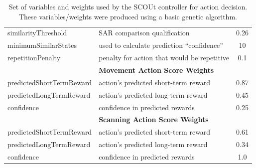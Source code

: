 \begin{table}
{\begin{tabular}{ l l c }
    similarityThreshold               & SAR comparison qualification  & 0.26  \\
    minimumSimilarStates              & used to calculate prediction ``confidence''    & 10    \\
    repetitionPenalty                 & penalty for action that would be repetitive                & 0.1   \\
    \hline
                                      & \textbf{Movement Action Score Weights}& \\
    predictedShortTermReward          & action's predicted short-term reward       & 0.87  \\
    predictedLongTermReward           & action's predicted long-term reward      & 0.45  \\
    confidence                        & confidence in predicted rewards       & 0.25  \\
    \hline
                                      & \textbf{Scanning Action Score Weights}& \\
    predictedShortTermReward          & action's predicted short-term reward       & 0.61  \\
    predictedLongTermReward           & action's predicted long-term reward      & 0.34  \\
    confidence                        & confidence in predicted rewards       & 1.0   \\
    \hline
  \end{tabular}}
  \caption{Set of variables and weights used by the SCOUt controller for action decision. These variables/weights were produced using a basic genetic algorithm.}
  \label{table:evolved_weight_set}
\end{table}


